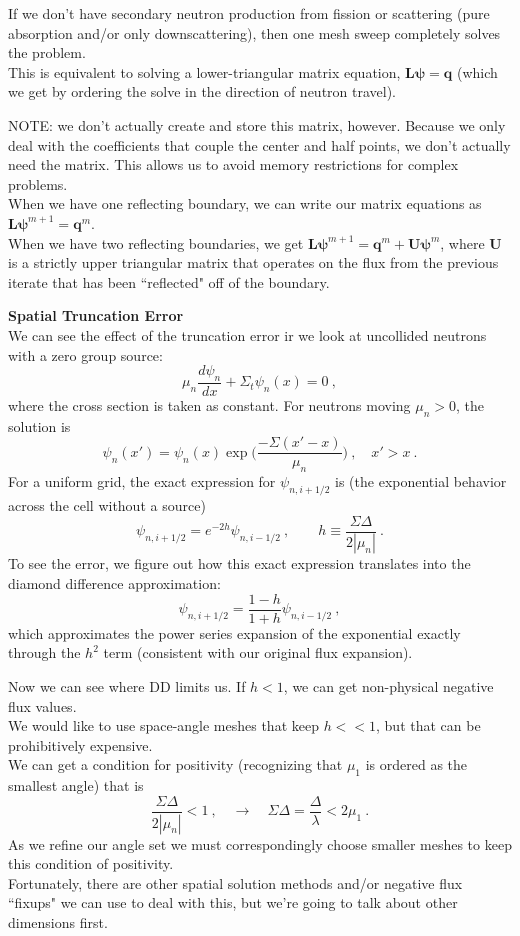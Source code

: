 \documentclass[12pt]{article}
\begin{document}
If we don't have secondary neutron production from fission or scattering (pure absorption and/or only downscattering), then one mesh sweep completely solves the problem. \\
This is equivalent to solving a lower-triangular matrix equation, $\mathbf{L}\mathbf{\psi} = \mathbf{q}$ (which we get by ordering the solve in the direction of neutron travel).

NOTE: we don't actually create and store this matrix, however. Because we only deal with the coefficients that couple the center and half points, we don't actually need the matrix.   This allows us to avoid memory restrictions for complex problems. \\
When we have one reflecting boundary, we can write our matrix equations as $\mathbf{L}\mathbf{\psi}^{m+1} = \mathbf{q}^m$.\\
When we have two reflecting boundaries, we get $\mathbf{L}\mathbf{\psi}^{m+1} = \mathbf{q}^m + \mathbf{U}\mathbf{\psi}^{m}$, where $\mathbf{U}$ is a strictly upper triangular matrix that operates on the flux from the previous iterate that has been ``reflected" off of the boundary.

\textbf{Spatial Truncation Error}\\
We can see the effect of the truncation error ir we look at uncollided neutrons with a zero group source:
\[
\mu_n \frac{d \psi_n}{dx} + \Sigma_t \psi_n(x) = 0\:,
\]
where the cross section is taken as constant. For neutrons moving $\mu_n > 0$, the solution is
\[
\psi_n(x') = \psi_n(x)\exp\bigl(\frac{-\Sigma (x'-x)}{\mu_n}\bigr)\:, \quad x' > x \:.
\]
For a uniform grid, the exact expression for $\psi_{n,i+1/2}$ is (the exponential behavior across the cell without a source)
\[
\psi_{n,i+1/2} = e^{-2h} \psi_{n,i-1/2}\:, \qquad h \equiv \frac{\Sigma \Delta}{2|\mu_n|} \:.
\]
To see the error, we figure out how this exact expression translates into the diamond difference approximation:
\[
\psi_{n,i+1/2} = \frac{1 - h}{1 + h}\psi_{n,i-1/2}\:,
\]
which approximates the power series expansion of the exponential exactly through the $h^2$ term (consistent with our original flux expansion). 

Now we can see where DD limits us. If $h < 1$, we can get non-physical negative flux values. \\
We would like to use space-angle meshes that keep $h<<1$, but that can be prohibitively expensive. \\
We can get a condition for positivity (recognizing that $\mu_1$ is ordered as the smallest angle) that is 
\[
\frac{\Sigma \Delta}{2|\mu_n|} < 1 \:, \quad \rightarrow \quad \Sigma \Delta = \frac{\Delta}{\lambda} < 2 \mu_1\:.
\]
As we refine our angle set we must correspondingly choose smaller meshes to keep this condition of positivity.\\
Fortunately, there are other spatial solution methods and/or negative flux ``fixups" we can use to deal with this, but we're going to talk about other dimensions first. 
\end{document}
